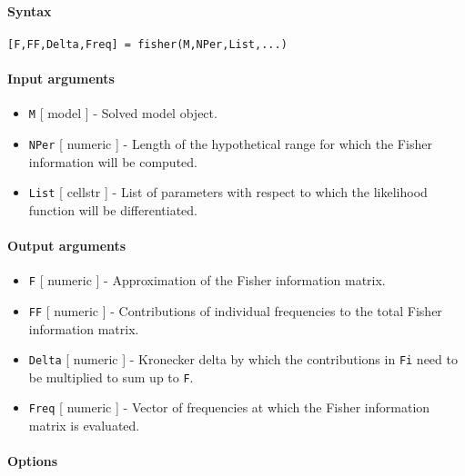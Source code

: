 


	\paragraph{Syntax}\label{syntax}

\begin{verbatim}
[F,FF,Delta,Freq] = fisher(M,NPer,List,...)
\end{verbatim}

\paragraph{Input arguments}\label{input-arguments}

\begin{itemize}
\item
  \texttt{M} {[} model {]} - Solved model object.
\item
  \texttt{NPer} {[} numeric {]} - Length of the hypothetical range for
  which the Fisher information will be computed.
\item
  \texttt{List} {[} cellstr {]} - List of parameters with respect to
  which the likelihood function will be differentiated.
\end{itemize}

\paragraph{Output arguments}\label{output-arguments}

\begin{itemize}
\item
  \texttt{F} {[} numeric {]} - Approximation of the Fisher information
  matrix.
\item
  \texttt{FF} {[} numeric {]} - Contributions of individual frequencies
  to the total Fisher information matrix.
\item
  \texttt{Delta} {[} numeric {]} - Kronecker delta by which the
  contributions in \texttt{Fi} need to be multiplied to sum up to
  \texttt{F}.
\item
  \texttt{Freq} {[} numeric {]} - Vector of frequencies at which the
  Fisher information matrix is evaluated.
\end{itemize}

\paragraph{Options}\label{options}

